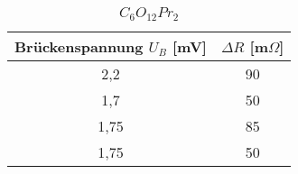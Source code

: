 \begin{table}[ht]
	\begin{center}
		\begin{tabular}{cc}
			Brückenspannung $U_B$ [mV] & $\Delta R$ [m$\Omega$]\\ \hline
			2,2	&90\\
			1,7	&50\\
			1,75&85\\
			1,75&50\\
		\end{tabular}
		\caption{$C_6O_{12}Pr_2$}
		\label{tab1}
	\end{center}
\end{table}